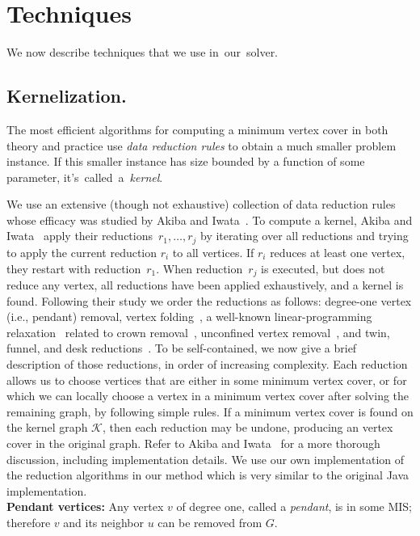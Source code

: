\documentclass[twoside,leqno,twocolumn]{article}
\begin{document}
\section{Techniques}
\label{sec:techniques}
We now describe techniques that we use in~our~solver.
\subsection{Kernelization.}
The most efficient algorithms for computing a minimum vertex cover in both theory and practice use \emph{data reduction rules} to obtain a much smaller problem instance. If this smaller instance has size bounded by a function of some parameter, it's~called~a~\emph{kernel}. 

We use an extensive (though not exhaustive) collection of data reduction rules whose efficacy was studied by Akiba and Iwata~\cite{akiba-tcs-2016}. To compute a kernel, Akiba and Iwata~\cite{akiba-tcs-2016} apply their
reductions~$r_1, \dots, r_j$ by iterating over all reductions and trying to
apply the current reduction $r_i$ to all vertices. If $r_i$ reduces at
least one vertex, they restart with reduction~$r_1$. When reduction~$r_j$ 
is executed, but does not reduce any vertex, all reductions have been applied
exhaustively, and a kernel is found. Following their study we order the reductions
as follows: degree-one vertex (i.e., pendant) removal, vertex folding~\cite{chen-1999}, a well-known linear-programming 
relaxation~\cite{iwata-2014,nemhauser-1975} related to crown removal~\cite{abu-khzam-2007}, unconfined vertex removal~\cite{Xiao201392}, and twin, funnel, and desk reductions~\cite{Xiao201392}.
To be self-contained, we now give a brief description of those reductions, in order of increasing complexity. Each reduction allows us to choose vertices that are either in some minimum vertex cover, or for which we can locally choose a vertex in a minimum vertex cover after solving the remaining graph, by following simple rules. If a minimum vertex cover  is found on the kernel graph $\mathcal{K}$, then each reduction may be undone, producing an vertex cover in the original graph. Refer to Akiba and Iwata~\cite{akiba-tcs-2016} for a more thorough discussion, including implementation details. We use our own implementation of the reduction algorithms in our method which is very similar to the original Java implementation. \\

\noindent\textbf{Pendant vertices:} Any vertex $v$ of degree one, called a \emph{pendant}, is in some MIS; therefore $v$ and its neighbor $u$ can be removed from $G$. \\
\end{document}
